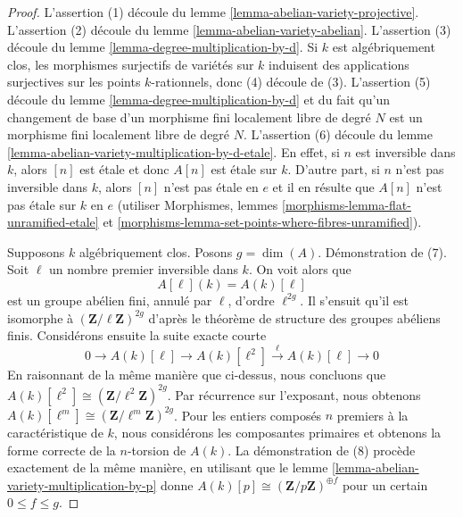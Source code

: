 \begin{proof}
L'assertion (1) découle du lemme \ref{lemma-abelian-variety-projective}.
L'assertion (2) découle du lemme \ref{lemma-abelian-variety-abelian}.
L'assertion (3) découle du lemme \ref{lemma-degree-multiplication-by-d}.
Si $k$ est algébriquement clos, les morphismes surjectifs de variétés
sur $k$ induisent des applications surjectives sur les points $k$-rationnels, donc
(4) découle de (3).
L'assertion (5) découle du lemme \ref{lemma-degree-multiplication-by-d}
et du fait qu'un changement de base d'un morphisme fini localement libre
de degré $N$ est un morphisme fini localement libre de degré $N$.
L'assertion (6) découle du 
lemme \ref{lemma-abelian-variety-multiplication-by-d-etale}.
En effet, si $n$ est inversible dans $k$, alors $[n]$ est \'etale
et donc $A[n]$ est \'etale sur $k$.
D'autre part, si $n$ n'est pas inversible dans $k$, alors
$[n]$ n'est pas \'etale en $e$ et il en résulte que $A[n]$
n'est pas \'etale sur $k$ en $e$ (utiliser
Morphismes, lemmes \ref{morphisms-lemma-flat-unramified-etale} et
\ref{morphisms-lemma-set-points-where-fibres-unramified}).

\medskip\noindent
Supposons $k$ algébriquement clos. Posons $g = \dim(A)$. Démonstration de (7).
Soit $\ell$ un nombre premier inversible dans $k$. On voit alors que
$$
A[\ell](k) = A(k)[\ell]
$$
est un groupe abélien fini, annulé par $\ell$, d'ordre $\ell^{2g}$.
Il s'ensuit qu'il est isomorphe à $(\mathbf{Z}/\ell\mathbf{Z})^{2g}$
d'après le théorème de structure des groupes abéliens finis. Considérons ensuite
la suite exacte courte
$$
0 \to A(k)[\ell] \to A(k)[\ell^2] \xrightarrow{\ell} A(k)[\ell] \to 0
$$
En raisonnant de la même manière que ci-dessus, nous concluons que 
$A(k)[\ell^2] \cong (\mathbf{Z}/\ell^2\mathbf{Z})^{2g}$.
Par récurrence sur l'exposant, nous obtenons
$A(k)[\ell^m] \cong (\mathbf{Z}/\ell^m\mathbf{Z})^{2g}$.
Pour les entiers composés $n$ premiers à la caractéristique de $k$,
nous considérons les composantes primaires et obtenons la forme correcte de la
$n$-torsion de $A(k)$.
La démonstration de (8) procède exactement de la même manière, en utilisant que
le lemme \ref{lemma-abelian-variety-multiplication-by-p} donne
$A(k)[p] \cong (\mathbf{Z}/p\mathbf{Z})^{\oplus f}$ pour un certain $0 \leq f \leq g$.
\end{proof}

